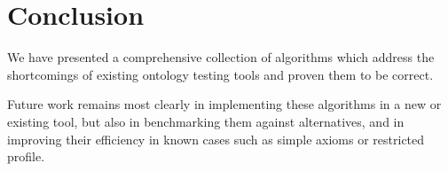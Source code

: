 \documentclass[paper.tex]{subfiles}
\begin{document}
\section{Conclusion}
\label{sec:conclusion}

We have presented a comprehensive collection of algorithms which address the shortcomings of existing ontology testing tools and proven them to be correct.

Future work remains most clearly in implementing these algorithms in a new or existing tool, but also in benchmarking them against alternatives, and in improving their efficiency in known cases such as simple axioms or restricted profile.
\end{document}

